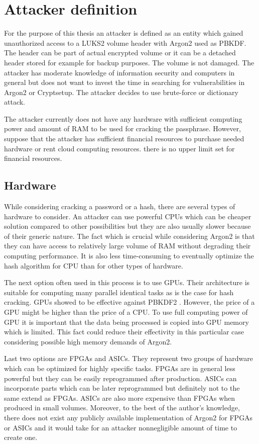 \documentclass[nolof]{fithesis3}
\begin{document}
\section{Attacker definition}
\label{sec:attacker}
For the purpose of this thesis an attacker is defined as an entity which gained unauthorized access to a LUKS2 volume header with Argon2 used as PBKDF. The header can be part of actual encrypted volume or it can be a detached header stored for example for backup purposes. The volume is not damaged. The attacker has moderate knowledge of information security and computers in general but does not want to invest the time in searching for vulnerabilities in Argon2 or Cryptsetup. The attacker decides to use brute-force or dictionary attack.

The attacker currently does not have any hardware with sufficient computing power and amount of RAM to be used for cracking the passphrase. However, suppose that the attacker has sufficient financial resources to purchase needed hardware or rent cloud computing resources. there is no upper limit set for financial resources.

\subsection{Hardware}
While considering cracking a password or a hash, there are several types of hardware to consider. An attacker can use powerful CPUs which can be cheaper solution compared to other possibilities but they are also usually slower because of their generic nature. The fact which is crucial while considering Argon2 is that they can have access to relatively large volume of RAM without degrading their computing performance. It is also less time-consuming to eventually optimize the hash algorithm for CPU than for other types of hardware.

The next option often used in this process is to use GPUs. Their architecture is suitable for computing many parallel identical tasks as is the case for hash cracking. GPUs showed to be effective against PBKDF2 \parencite{mosnacek}. However, the price of a GPU might be higher than the price of a CPU. To use full computing power of GPU it is important that the data being processed is copied into GPU memory which is limited. This fact could  reduce their effectivity in this particular case considering possible high memory demands of Argon2.

Last two options are FPGAs and ASICs. They represent two groups of hardware which can be optimized for highly specific tasks. FPGAs are in general less powerful but they can be easily reprogrammed after production. ASICs can incorporate parts which can be later reprogrammed but definitely not to the same extend as FPGAs. ASICs are also more expensive than FPGAs when produced in small volumes. Moreover, to the best of the author's knowledge, there does not exist any publicly available implementation of Argon2 for FPGAs or ASICs and it would take for an attacker nonnegligible amount of time to create one.
\end{document}
